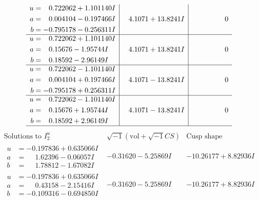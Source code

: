 \documentclass[1p]{elsarticle_modified}
\theoremstyle{definition}
\newcommand{\I}{\sqrt{-1}}
\begin{document}
$$\begin{array}{c|c|c}
\begin{aligned}
u &= \phantom{-}0.722062 + 1.101140 I \\
a &= \phantom{-}0.004104 - 0.197466 I \\
b &= -0.795178 - 0.256311 I\end{aligned}
 & \phantom{-}4.1071 + 13.8241 I & \phantom{-0.000000 } 0 \\ \hline\begin{aligned}
u &= \phantom{-}0.722062 + 1.101140 I \\
a &= \phantom{-}0.15676 - 1.95744 I \\
b &= \phantom{-}0.18592 - 2.96149 I\end{aligned}
 & \phantom{-}4.1071 + 13.8241 I & \phantom{-0.000000 } 0 \\ \hline\begin{aligned}
u &= \phantom{-}0.722062 - 1.101140 I \\
a &= \phantom{-}0.004104 + 0.197466 I \\
b &= -0.795178 + 0.256311 I\end{aligned}
 & \phantom{-}4.1071 - 13.8241 I & \phantom{-0.000000 } 0 \\ \hline\begin{aligned}
u &= \phantom{-}0.722062 - 1.101140 I \\
a &= \phantom{-}0.15676 + 1.95744 I \\
b &= \phantom{-}0.18592 + 2.96149 I\end{aligned}
 & \phantom{-}4.1071 - 13.8241 I & \phantom{-0.000000 } 0\\
 \hline 
 \end{array}$$\newpage$$\begin{array}{c|c|c}  
\text{Solutions to }I^u_{2}& \I (\text{vol} + \sqrt{-1}CS) & \text{Cusp shape}\\
 \hline 
\begin{aligned}
u &= -0.197836 + 0.635066 I \\
a &= \phantom{-}1.62396 - 0.06057 I \\
b &= \phantom{-}1.78812 - 1.67082 I\end{aligned}
 & -0.31620 - 5.25869 I & -10.26177 + 8.82936 I \\ \hline\begin{aligned}
u &= -0.197836 + 0.635066 I \\
a &= \phantom{-}0.43158 - 2.15416 I \\
b &= -0.109316 - 0.694850 I\end{aligned}
 & -0.31620 - 5.25869 I & -10.26177 + 8.82936 I \\ \hline\begin{aligned}

\end{aligned}
\end{array}$$
\end{document}
